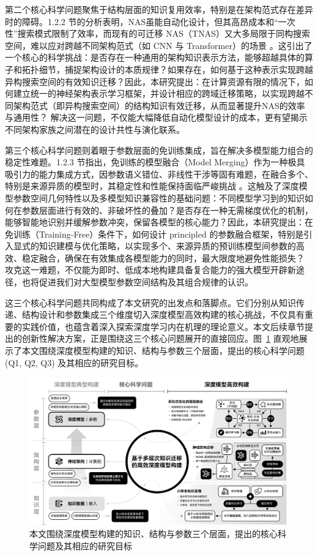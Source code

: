 \documentclass[../main.tex]{subfiles}
\begin{document}
第二个核心科学问题聚焦于结构层面的知识复用效率，特别是在架构范式存在差异时的障碍。1.2.2 节的分析表明，NAS虽能自动化设计，但其高昂成本和“一次性”搜索模式限制了效率，而现有的可迁移 NAS（TNAS）又大多局限于同构搜索空间，难以应对跨越不同架构范式（如 CNN 与 Transformer）的场景 。这引出了一个核心的科学挑战：是否存在一种通用的架构知识表示方法，能够超越具体的算子和拓扑细节，捕捉架构设计的本质规律？如果存在，如何基于这种表示实现跨越异构搜索空间的有效知识迁移？因此，本研究提出：在计算资源有限的情况下，如何建立统一的神经架构表示学习框架，并设计相应的跨域迁移策略，以实现跨越不同架构范式（即异构搜索空间）的结构知识有效迁移，从而显著提升NAS的效率与通用性？ 解决这一问题，不仅能大幅降低自动化模型设计的成本，更有望揭示不同架构家族之间潜在的设计共性与演化联系。

第三个核心科学问题则着眼于参数层面的免训练集成，旨在解决多模型能力组合的稳定性难题。1.2.3 节指出，免训练的模型融合（Model Merging）作为一种极具吸引力的能力集成方式，因参数语义错位、非线性干涉等固有难题，在融合多个、特别是来源异质的模型时，其稳定性和性能保持面临严峻挑战 。这触及了深度模型参数空间几何特性以及多模型知识兼容性的基础问题：不同模型学习到的知识如何在参数层面进行有效的、非破坏性的叠加？是否存在一种无需梯度优化的机制，能够智能地识别并缓解参数冲突，保留各模型的核心能力？因此，本研究提出：在免训练（Training-Free）条件下，如何设计 principled 的参数融合框架，特别是引入显式的知识建模与优化策略，以实现多个、来源异质的预训练模型间参数的高效、稳定融合，确保在有效集成各模型能力的同时，最大限度地避免性能损失？ 攻克这一难题，不仅能为即时、低成本地构建具备复合能力的强大模型开辟新途径，也将促进我们对大型模型参数空间结构及其组合规律的认识。

这三个核心科学问题共同构成了本文研究的出发点和落脚点。它们分别从知识传递、结构设计和参数集成三个维度切入深度模型高效构建的核心挑战，不仅具有重要的实践价值，也蕴含着深入探索深度学习内在机理的理论意义。本文后续章节提出的创新性解决方案，正是围绕这三个核心问题展开的直接回应。图~\ref{fig:research_questions} 直观地展示了本文围绕深度模型构建的知识、结构与参数三个层面，提出的核心科学问题 (Q1, Q2, Q3) 及其相应的研究目标。

\begin{figure}
	\centering
	\includegraphics[width=\linewidth]{research_question.pdf}
	\caption{本文围绕深度模型构建的知识、结构与参数三个层面，提出的核心科学问题及其相应的研究目标}\label{fig:research_questions}
\end{figure}
\end{document}
